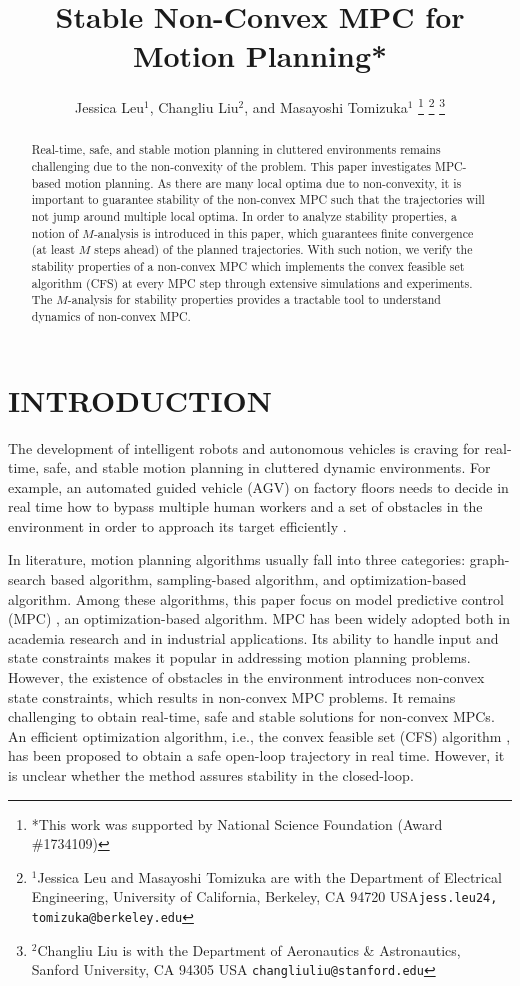 \documentclass[letterpaper, 10 pt, conference]{ieeeconf}  %
\title{\LARGE \bf
Stable Non-Convex MPC for Motion Planning*
}
\author{ Jessica Leu$^{1}$, Changliu Liu$^{2}$,  and Masayoshi Tomizuka$^{1}$%
\thanks{*This work was supported by National Science Foundation (Award \#1734109)}%
\thanks{$^{1}$Jessica Leu and Masayoshi Tomizuka are with the Department of Electrical Engineering, University of California,
Berkeley, CA 94720 USA{\tt\small jess.leu24, tomizuka@berkeley.edu}}%
\thanks{$^{2}$Changliu Liu is with the Department of Aeronautics \& Astronautics, Sanford University, CA 94305 USA
        {\tt\small changliuliu@stanford.edu}}%
}
\begin{document}
\maketitle
\thispagestyle{empty}
\pagestyle{empty}


\begin{abstract}

Real-time, safe, and stable motion planning in cluttered environments remains challenging due to the non-convexity of the problem. This paper investigates MPC-based motion planning. As there are many local optima due to non-convexity, it is important to guarantee stability of the non-convex MPC such that the trajectories will not jump around multiple local optima. In order to analyze stability properties, a notion of $M$-analysis is introduced in this paper, which guarantees finite convergence (at least $M$ steps ahead) of the planned trajectories. With such notion, we verify the stability properties of a non-convex MPC which implements the convex feasible set algorithm (CFS) at every MPC step through extensive simulations and experiments. The $M$-analysis for stability properties provides a tractable tool to understand dynamics of non-convex MPC.

\end{abstract}


\section{INTRODUCTION}

The development of intelligent robots and autonomous vehicles is craving for real-time, safe, and stable motion planning in cluttered dynamic environments. For example, an automated guided vehicle (AGV) on factory floors \cite{wu2004modeling} needs to decide in real time how to bypass multiple human workers and a set of obstacles in the environment in order to approach its target efficiently \cite{wang2009autonomous}\cite{oleari2014industrial}. 

In literature, motion planning algorithms usually fall into three categories: graph-search based algorithm, sampling-based algorithm, and optimization-based algorithm. Among these algorithms, this paper focus on model predictive control (MPC) \cite{rawlings1999tutorial}, an optimization-based algorithm. MPC has been widely adopted both in academia research and in industrial applications. Its ability to handle input and state constraints makes it popular in addressing motion planning problems. However, the existence of obstacles in the environment introduces non-convex state constraints, which results in non-convex MPC problems. It remains challenging to obtain real-time, safe and stable solutions for non-convex MPCs. An efficient optimization algorithm, i.e., the convex feasible set (CFS) algorithm \cite{liu2018convex}, has been proposed to obtain a safe open-loop trajectory in real time. However, it is unclear whether the method assures stability in the closed-loop.
\end{document}
